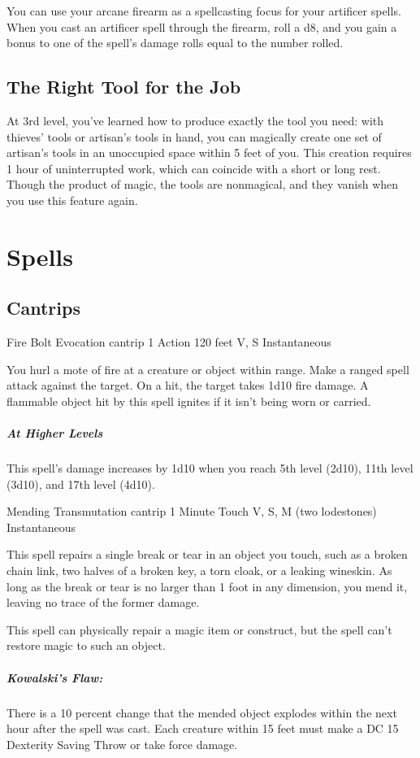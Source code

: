{You can use your arcane firearm as a spellcasting focus for your artificer spells. When you cast an artificer spell through the firearm, roll a d8, and you gain a bonus to one of the spell's damage rolls equal to the number rolled.

\subsection*{The Right Tool for the Job}
At 3rd level, you've learned how to produce exactly the tool you need: with thieves' tools or artisan's tools in hand, you can magically create one set of artisan's tools in an unoccupied space within 5 feet of you. This creation requires 1 hour of uninterrupted work, which can coincide with a short or long rest. Though the product of magic, the tools are nonmagical, and they vanish when you use this feature again.

\section*{Spells}
\subsection*{Cantrips}

\DndSpellHeader
	{Fire Bolt}
	{Evocation cantrip}
	{1 Action}
	{120 feet}
	{V, S}
	{Instantaneous}

You hurl a mote of fire at a creature or object within range. Make a ranged spell attack against the target. On a hit, the target takes 1d10 fire damage. A flammable object hit by this spell ignites if it isn’t being worn or carried.

\subparagraph*{At Higher Levels} This spell’s damage increases by 1d10 when you reach 5th level (2d10), 11th level (3d10), and 17th level (4d10).

\DndSpellHeader
  {Mending}
  {Transmutation cantrip}
  {1 Minute}
  {Touch}
  {V, S, M (two lodestones)}
  {Instantaneous}

This spell repairs a single break or tear in an object you touch, such as a broken chain link, two halves of a broken key, a torn cloak, or a leaking wineskin. As long as the break or tear is no larger than 1 foot in any dimension, you mend it, leaving no trace of the former damage.

This spell can physically repair a magic item or construct, but the spell can’t restore magic to such an object.

\subparagraph*{Kowalski's Flaw:} There is a 10 percent change that the mended object explodes within the next hour after the spell was cast. Each creature within 15 feet must make a DC 15 Dexterity Saving Throw or take  force damage.

}
